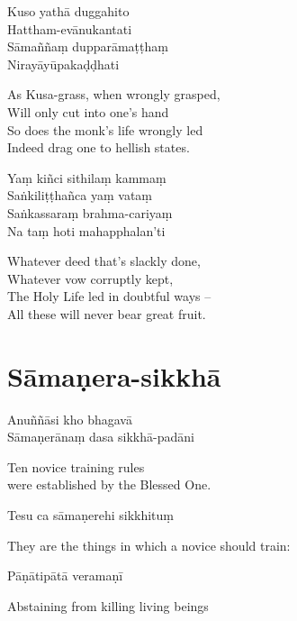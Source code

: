 Kuso yathā duggahito\\
Hattham-evānukantati\\
Sāmaññaṃ dupparāmaṭṭhaṃ\\
Nirayāyūpakaḍḍhati

\begin{english}
  As Kusa-grass, when wrongly grasped,\\
  Will only cut into one's hand\\
  So does the monk's life wrongly led\\
  Indeed drag one to hellish states.
\end{english}

Yaṃ kiñci sithilaṃ kammaṃ\\
Saṅkiliṭṭhañca yaṃ vataṃ\\
Saṅkassaraṃ brahma-cariyaṃ\\
Na taṃ hoti mahapphalan'ti

\begin{english}
  Whatever deed that's slackly done,\\
  Whatever vow corruptly kept,\\
  The Holy Life led in doubtful ways --\\
  All these will never bear great fruit. 
\end{english}

\ifhandbookedition
\clearpage
\fi

\section{Sāmaṇera-sikkhā}


Anuññāsi kho bhagavā\\
Sāmaṇerānaṃ dasa sikkhā-padāni

\begin{cprenglish}
  Ten novice training rules\\
  were established by the Blessed One.
\end{cprenglish}

Tesu ca sāmaṇerehi sikkhituṃ

\begin{cprenglish}
  They are the things in which a novice should train:
\end{cprenglish}

Pāṇātipātā veramaṇī

\begin{cprenglish}
  Abstaining from killing living beings
\end{cprenglish}

